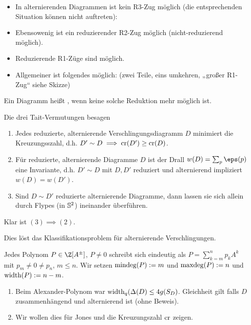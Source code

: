 \begin{nt}
    \begin{itemize}
        \item
            In alternierenden Diagrammen ist kein R3-Zug möglich (die entsprechenden Situation können nicht auftreten):
        \item
            Ebensowenig ist ein reduzierender R2-Zug möglich (nicht-reduzierend möglich).
        \item
            Reduzierende R1-Züge sind möglich.
        \item
            Allgemeiner ist folgendes möglich: (zwei Teile, eins umkehren, „großer R1-Zug“ siehe Skizze)
    \end{itemize}
\end{nt}

\begin{df}
    Ein Diagramm heißt , wenn keine solche Reduktion mehr möglich ist.
\end{df}

Die drei Tait-Vermutungen besagen
\begin{enumerate}[(1)]
    \item
        Jedes reduzierte, alternierende Verschlingungsdiagramm $D$ minimiert die Kreuzungsszahl, d.h. $D' \sim D \implies \Cr(D') \ge \Cr(D)$.
    \item
        Für reduzierte, alternierende Diagramme $D$ ist der Drall $w(D) = \sum_{p} \eps(p)$ eine Invariante, d.h. $D' \sim D$ mit $D, D'$ reduziert und alternierend impliziert $w(D) = w(D')$.
    \item
        Sind $D \sim D'$ reduzierte alternierende Diagramme, dann lassen sie sich allein durch Flypes (in $\S^2$) ineinander überführen.
\end{enumerate}
\begin{note}
    Klar ist $(3) \implies (2)$.
\end{note}
Dies löst das Klassifikationsproblem für alternierende Verschlingungen.


\begin{df}
    Jedes Polynom $P \in \Z[A^\pm]$, $P \neq 0$ schreibt sich eindeutig als
    \begin{math}
        P = \sum_{k=m}^n p_k A^k
    \end{math}
    mit $p_m \neq 0 \neq p_n$, $m \le n$.
    Wir setzen $\mindeg(P) := m$ und $\maxdeg(P) := n$ und $\width(P) := n - m$.
\end{df}

\begin{ex}
    \begin{enumerate}[1.]
        \item
            Beim Alexander-Polynom war $\width_q(\Delta(D) \le 4g(S_D)$.
            Gleichheit gilt falls $D$ zusammenhängend und alternierend ist (ohne Beweis).
        \item
            Wir wollen dies für Jones und die Kreuzungszahl $\Cr$ zeigen.
    \end{enumerate}
\end{ex}

